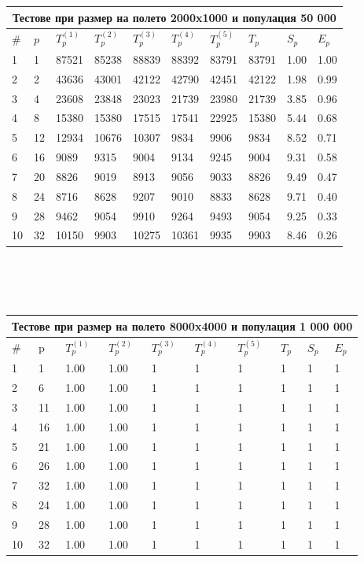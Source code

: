 \documentclass[12pt]{article}
\begin{document}
\begin{tabular}{ |p{0.6cm}||p{0.8cm}|p{0.8cm}|p{0.8cm}|p{0.8cm}|p{0.8cm}|p{0.8cm}|p{0.8cm}|p{0.8cm}|p{0.8cm}| }
 \hline
 \multicolumn{10}{|c|}{Тестове при размер на полето 2000x1000 и популация 50 000} \\
 \hline
 \# & $p$ & $T^{(1)}_p$ & $T^{(2)}_p$ & $T^{(3)}_p$ & $T^{(4)}_p$ & $T^{(5)}_p$ & $T_p$ & $S_p$ & $E_p$ \\
 \hline
1  & 1  & 87521 & 85238 & 88839 & 88392 & 83791 & 83791 & 1.00 & 1.00 \\
2  & 2  & 43636 &  43001 & 42122 & 42790 & 42451 & 42122 & 1.98 & 0.99 \\
3  & 4  & 23608 & 23848 & 23023 & 21739 & 23980 & 21739 & 3.85 & 0.96 \\
4  & 8  & 15380 & 15380 & 17515 & 17541 & 22925 & 15380 & 5.44 & 0.68 \\
5  & 12 & 12934 & 10676 & 10307 & 9834 & 9906 & 9834 & 8.52 & 0.71 \\
6  & 16 & 9089 & 9315 & 9004 & 9134 & 9245 & 9004 & 9.31 & 0.58 \\
7  & 20 & 8826 & 9019 & 8913 & 9056 & 9033 & 8826 & 9.49 & 0.47 \\
8  & 24 & 8716 & 8628 & 9207 & 9010 & 8833 & 8628 & 9.71 & 0.40 \\
9  & 28 & 9462 & 9054 & 9910 & 9264 & 9493 & 9054 & 9.25 & 0.33 \\
10 & 32 & 10150 & 9903 & 10275 & 10361 & 9935 & 9903 & 8.46 & 0.26 \\
 \hline
\end{tabular}
\\
\\
\\
\begin{tabular}{ |p{0.6cm}||p{0.8cm}|p{0.8cm}|p{0.8cm}|p{0.8cm}|p{0.8cm}|p{0.8cm}|p{0.8cm}|p{0.8cm}|p{0.8cm}| }
 \hline
 \multicolumn{10}{|c|}{Тестове при размер на полето 8000x4000 и популация 1 000 000} \\
 \hline
 \# & p & $T^{(1)}_p$ & $T^{(2)}_p$ & $T^{(3)}_p$ & $T^{(4)}_p$ & $T^{(5)}_p$ & $T_p$ & $S_p$ & $E_p$ \\
 \hline
1  & 1  & 1.00  & 1.00 & 1 & 1 & 1 & 1 & 1 & 1 \\
2  & 6  & 1.00  & 1.00 & 1 & 1 & 1 & 1 & 1 & 1 \\
3  & 11  & 1.00  & 1.00 & 1 & 1 & 1 & 1 & 1 & 1 \\
4  & 16  & 1.00  & 1.00 & 1 & 1 & 1 & 1 & 1 & 1 \\
5  & 21 & 1.00  & 1.00 & 1 & 1 & 1 & 1 & 1 & 1 \\
6  & 26 & 1.00  & 1.00 & 1 & 1 & 1 & 1 & 1 & 1 \\
7  & 32 & 1.00  & 1.00 & 1 & 1 & 1 & 1 & 1 & 1 \\
8  & 24 & 1.00  & 1.00 & 1 & 1 & 1 & 1 & 1 & 1 \\
9  & 28 & 1.00  & 1.00 & 1 & 1 & 1 & 1 & 1 & 1 \\
10 & 32 & 1.00  & 1.00 & 1 & 1 & 1 & 1 & 1 & 1 \\
 \hline
\end{tabular}
\end{document}
